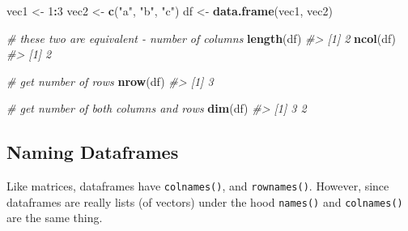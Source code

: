 \documentclass[]{book}
\newenvironment{Shaded}{\begin{snugshade}}{\end{snugshade}}
\newcommand{\KeywordTok}[1]{\textcolor[rgb]{0.13,0.29,0.53}{\textbf{#1}}}
\newcommand{\DecValTok}[1]{\textcolor[rgb]{0.00,0.00,0.81}{#1}}
\newcommand{\StringTok}[1]{\textcolor[rgb]{0.31,0.60,0.02}{#1}}
\newcommand{\CommentTok}[1]{\textcolor[rgb]{0.56,0.35,0.01}{\textit{#1}}}
\newcommand{\OperatorTok}[1]{\textcolor[rgb]{0.81,0.36,0.00}{\textbf{#1}}}
\newcommand{\NormalTok}[1]{#1}
\begin{document}
\begin{Shaded}
\begin{Highlighting}[]
\NormalTok{vec1 <-}\StringTok{ }\DecValTok{1}\OperatorTok{:}\DecValTok{3}
\NormalTok{vec2 <-}\StringTok{ }\KeywordTok{c}\NormalTok{(}\StringTok{"a"}\NormalTok{, }\StringTok{"b"}\NormalTok{, }\StringTok{"c"}\NormalTok{)}
\NormalTok{df <-}\StringTok{ }\KeywordTok{data.frame}\NormalTok{(vec1, vec2)}

\CommentTok{# these two are equivalent - number of columns}
\KeywordTok{length}\NormalTok{(df)}
\CommentTok{#> [1] 2}
\KeywordTok{ncol}\NormalTok{(df)}
\CommentTok{#> [1] 2}

\CommentTok{# get number of rows}
\KeywordTok{nrow}\NormalTok{(df)}
\CommentTok{#> [1] 3}

\CommentTok{# get number of both columns and rows}
\KeywordTok{dim}\NormalTok{(df)}
\CommentTok{#> [1] 3 2}
\end{Highlighting}
\end{Shaded}

\subsection{Naming Dataframes}\label{naming-dataframes}

Like matrices, dataframes have \texttt{colnames()}, and
\texttt{rownames()}. However, since dataframes are really lists (of
vectors) under the hood \texttt{names()} and \texttt{colnames()} are the
same thing.
\end{document}

